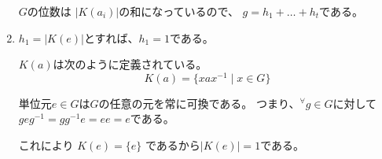 \documentclass[12pt,b5paper]{ltjsarticle}
\begin{document}
\begin{enumerate}
       $G$の位数は
       $|K(a_{i})|$の和になっているので、
       $g=h_{1}+\dots + h_{t}$である。

       \hrulefill

 \item $h_{1}=|K(e)|$とすれば、$h_{1}=1$である。

       \dotfill

       $K(a)$は次のように定義されている。
       \begin{equation}
        K(a) = \{xax^{-1} \mid x\in G \}
       \end{equation}

       単位元$e\in G$は$G$の任意の元を常に可換である。
       つまり、${}^{\forall}g\in G$に対して
       $geg^{-1}=gg^{-1}e=ee=e$である。

       これにより
       $K(e)=\{e\}$
       であるから$|K(e)|=1$である。

       \hrulefill

\end{enumerate}



\hrulefill
\end{document}
